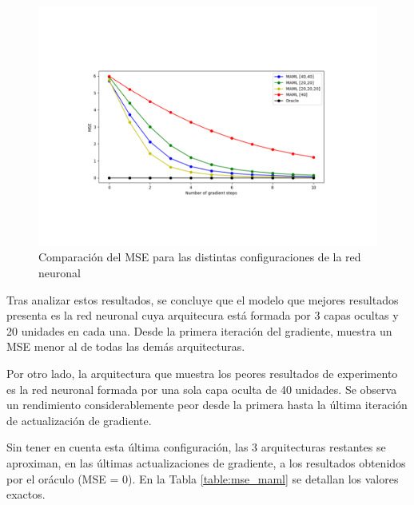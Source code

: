 \begin{figure}[H]
\begin{center}
 \includegraphics[width=0.8\linewidth]{Figuras/MAML/MSE.pdf}
\end{center}
\caption{Comparación del MSE para las distintas configuraciones de la red neuronal}
 \label{fig:mse_nnet}
\end{figure}

Tras analizar estos resultados, se concluye que el modelo que mejores resultados presenta es la red neuronal cuya arquitecura está formada por 3 capas ocultas y 20 unidades en cada una. Desde la primera iteración del gradiente, muestra un MSE menor al de todas las demás arquitecturas.

Por otro lado, la arquitectura que muestra los peores resultados de experimento es la red neuronal formada por una sola capa oculta de 40 unidades. Se observa un rendimiento considerablemente peor desde la primera hasta la última iteración de actualización de gradiente.

Sin tener en cuenta esta última configuración, las 3 arquitecturas restantes se aproximan, en las últimas actualizaciones de gradiente, a los resultados obtenidos por el oráculo (MSE = 0). En la Tabla \ref{table:mse_maml} se detallan los valores exactos.

\begin{table}[H]
\centering
{}%
\caption{MSE para las diferentes arquitucturas y cada una de las actualizaciones de gradiente.}\label{table:mse_maml}
\end{table}


